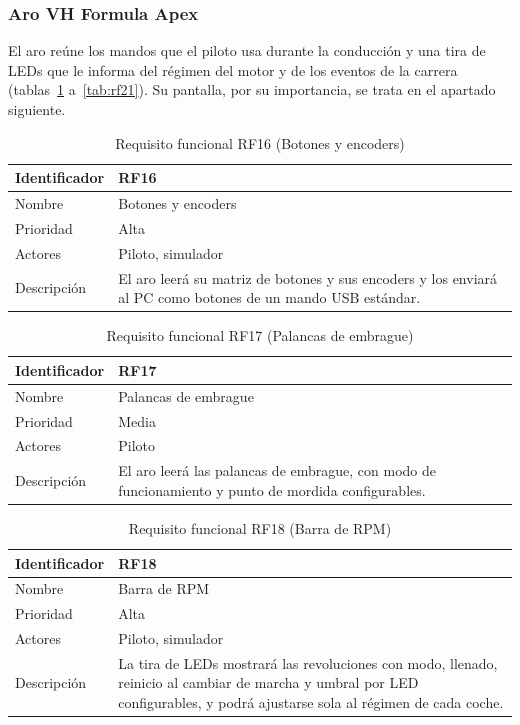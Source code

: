 \subsubsection{Aro VH Formula Apex}

El aro reúne los mandos que el piloto usa durante la conducción y una tira de LEDs que le informa del régimen del motor y de los eventos de la carrera (tablas~\ref{tab:rf16} a~\ref{tab:rf21}). Su pantalla, por su importancia, se trata en el apartado siguiente.

\begin{table}[H]
	\centering
	\renewcommand{\arraystretch}{2}
	\begin{tabular}{|l|p{10cm}|}
		\hline
		Identificador & RF16 \\
		\hline
		Nombre & Botones y encoders \\
		\hline
		Prioridad & Alta \\
		\hline
		Actores & Piloto, simulador \\
		\hline
		Descripción & El aro leerá su matriz de botones y sus encoders y los enviará al PC como botones de un mando USB estándar. \\
		\hline
	\end{tabular}
	\caption{Requisito funcional RF16 (Botones y encoders)}
	\label{tab:rf16}
\end{table}

\begin{table}[H]
	\centering
	\renewcommand{\arraystretch}{2}
	\begin{tabular}{|l|p{10cm}|}
		\hline
		Identificador & RF17 \\
		\hline
		Nombre & Palancas de embrague \\
		\hline
		Prioridad & Media \\
		\hline
		Actores & Piloto \\
		\hline
		Descripción & El aro leerá las palancas de embrague, con modo de funcionamiento y punto de mordida configurables. \\
		\hline
	\end{tabular}
	\caption{Requisito funcional RF17 (Palancas de embrague)}
	\label{tab:rf17}
\end{table}

\begin{table}[H]
	\centering
	\renewcommand{\arraystretch}{2}
	\begin{tabular}{|l|p{10cm}|}
		\hline
		Identificador & RF18 \\
		\hline
		Nombre & Barra de RPM \\
		\hline
		Prioridad & Alta \\
		\hline
		Actores & Piloto, simulador \\
		\hline
		Descripción & La tira de LEDs mostrará las revoluciones con modo, llenado, reinicio al cambiar de marcha y umbral por LED configurables, y podrá ajustarse sola al régimen de cada coche. \\
		\hline
	\end{tabular}
	\caption{Requisito funcional RF18 (Barra de RPM)}
	\label{tab:rf18}
\end{table}

